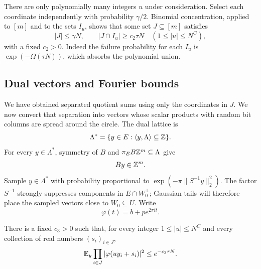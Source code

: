 There are only polynomially many integers $u$ under consideration.
Select each coordinate independently with probability $\gamma/2$.
Binomial concentration, applied to $[m]$ and to the sets $I_u$, shows
that some set $J\subseteq[m]$ satisfies
\begin{equation}\label{eq:lattice-small-coordinate-set}
 |J|\le\gamma N,
 \qquad |J\cap I_u|\ge c_2\tau N
       \quad(1\le|u|\le N^C),
\end{equation}
with a fixed $c_2>0$.  Indeed the failure probability for each $I_u$
is $\exp(-\Omega(\tau N))$, which absorbs the polynomial union.

\subsection{Dual vectors and Fourier bounds}

We have obtained separated quotient sums using only the coordinates
in $J$.  We now convert that separation into vectors whose scalar
products with random bit columns are spread around the circle.
The dual lattice is
\[
 \Lambda^*=\{y\in E:\langle y,\Lambda\rangle\subseteq\mathbb Z\}.
\]
For every $y\in\Lambda^*$, symmetry of $B$ and
$\pi_E B\mathbb Z^m\subseteq\Lambda$ give
\begin{equation}\label{eq:lattice-dual-integrality}
 By\in\mathbb Z^m.
\end{equation}
Sample $y\in\Lambda^*$ with probability proportional to
$\exp(-\pi\lVert S^{-1}y\rVert_2^2)$.
The factor $S^{-1}$ strongly suppresses components in
$E\cap W_0^\perp$; Gaussian tails will therefore place the sampled
vectors close to $W_0\subseteq U$.  Write
\[
 \varphi(t)=b+p e^{2\pi i t}.
\]

\begin{lemma}\label{lem:dual-fourier-average}
There is a fixed $c_3>0$ such that, for every integer
$1\le|u|\le N^C$ and every collection of real numbers $(s_i)_{i\in J}$,
\begin{equation}\label{eq:lattice-fourier-average}
 \mathbb E_y\prod_{i\in J}|\varphi(uy_i+s_i)|^2
       \le e^{-c_3\tau N}.
\end{equation}
\end{lemma}


